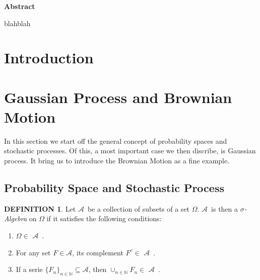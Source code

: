\documentclass[a4paper, twoside, 11pt]{article}
\theoremstyle{definition}
\newtheorem{definition}{DEFINITION}[section]
\def\AA{$\mathscr{A}$\ }
\newcommand{\compl}[1]{{#1}^{c}}
\renewenvironment{abstract}{
	\begin{center}
		  \Large
		  \textbf{Abstract}
		  \hspace{2em}
	\end{center}				
  }{}
\begin{document}
  
  \newpage

  \thispagestyle{empty}
  \begin{abstract}
	blahblah
  \end{abstract}
\newpage

\thispagestyle{empty}
\mbox{}
\newpage
\fancyhead[LO, RE]{}
\fancyfoot[LE, RO]{}
\tableofcontents
\newpage
\thispagestyle{empty}
\mbox{}
\newpage

\fancyhead[RO]{\leftmark}
\fancyhead[LE]{\rightmark}
\fancyfoot[LE, RO]{\large \thepage}
\setcounter{section}{0}
\setcounter{page}{1}
\section{Introduction}

\newpage

\section{Gaussian Process and Brownian Motion }
In this section we start off the general concept of probability spaces and stochastic processes. Of this, a most important case we then discribe, is Gaussian process. It bring us to introduce the Brownian Motion as a fine example.

\subsection{Probability Space and Stochastic Process }
\begin{definition}
  Let \AA be a collection of subsets of a set $\Omega$. \AA is then a \emph{$\sigma$- Algebra} on $\Omega$ if it satisfies the following conditions:
  \begin{enumerate}[topsep=0pt, itemsep=-1ex, partopsep=1ex, parsep=1ex, label=(\roman*)]
	\item $\Omega \in $ \AA.
	\item For any set $F \in \mathscr{A}$, its complement $\compl{F} \in$ \AA.
	\item If a serie $\{F_n\}_{n \in \mathbb{N}} \subseteq \mathscr{A}$, then $\cup_{n \in \mathbb{N}}F_n \in $ \AA.
  \end{enumerate}
\end{definition}
\end{document}
